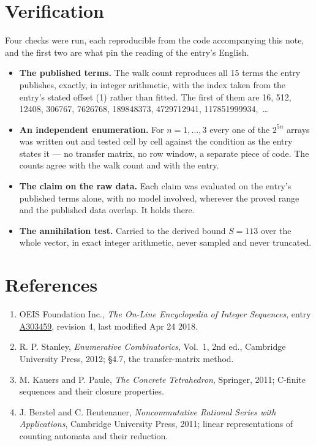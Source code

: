 \documentclass[11pt]{article}
\theoremstyle{definition}
\begin{document}
\section{Verification}

Four checks were run, each reproducible from the code accompanying this note, and the first two are what pin the reading of the entry's English.

\begin{itemize}

\item {\bfseries The published terms.} The walk count reproduces all 15 terms the entry publishes, exactly, in integer arithmetic, with the index taken from the entry's stated offset (1) rather than fitted. The first of them are 16, 512, 12408, 306767, 7626768, 189848373, 4729712941, 117851999934,~\dots

\item {\bfseries An independent enumeration.} For $n = 1,\dots,3$ every one of the $2^{5n}$ arrays was written out and tested cell by cell against the condition as the entry states it --- no transfer matrix, no row window, a separate piece of code. The counts agree with the walk count and with the entry.

\item {\bfseries The claim on the raw data.} Each claim was evaluated on the entry's published terms alone, with no model involved, wherever the proved range and the published data overlap. It holds there.

\item {\bfseries The annihilation test.} Carried to the derived bound $S = 113$ over the whole vector, in exact integer arithmetic, never sampled and never truncated.

\end{itemize}

\section{References}

\begin{enumerate}

\item OEIS Foundation Inc., \emph{The On-Line Encyclopedia of Integer Sequences}, entry \href{https://oeis.org/A303459}{A303459}, revision 4, last modified Apr 24 2018.

\item R. P. Stanley, \emph{Enumerative Combinatorics}, Vol.~1, 2nd ed., Cambridge University Press, 2012; \S4.7, the transfer-matrix method.

\item M. Kauers and P. Paule, \emph{The Concrete Tetrahedron}, Springer, 2011; C-finite sequences and their closure properties.

\item J. Berstel and C. Reutenauer, \emph{Noncommutative Rational Series with Applications}, Cambridge University Press, 2011; linear representations of counting automata and their reduction.

\end{enumerate}
\end{document}
